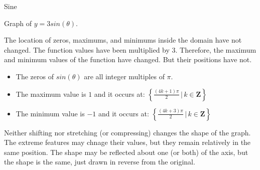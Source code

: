 \documentclass{ximera}
\begin{document}
\begin{example} Sine



Graph of $y = 3 sin(\theta)$.

\begin{image}
\end{image}


The location of zeros, maximums, and minimums inside the domain have not changed.  The function values have been multiplied by $3$. Therefore, the maximum and minimum values of the function have changed. But their positions have not.

\begin{itemize}
\item The zeros of $sin(\theta)$ are all integer multiples of $\pi$.
\item The maximum value is $1$ and it occurs at:  $\left\{     \frac{(4k+1)\pi}{2} \, | \, k \in \textbf{Z}     \right\}$
\item The minimum value is $-1$ and it occurs at:  $\left\{    \frac{(4k+3)\pi}{2} \, | \, k \in \textbf{Z}     \right\}$
\end{itemize}













\end{example}






Neither shifting nor stretching (or compressing) changes the shape of the graph.  The extreme features may chnage their values, but they remain relatively in the same position.  The shape may be reflected about one (or both) of the axis, but the shape is the same, just drawn in reverse from the original.
\end{document}
